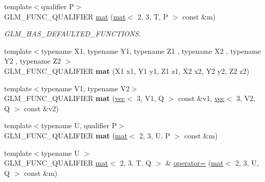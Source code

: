 \begin{DoxyCompactItemize}
{\footnotesize template$<$qualifier P$>$ }\\G\+L\+M\+\_\+\+F\+U\+N\+C\+\_\+\+Q\+U\+A\+L\+I\+F\+I\+ER \hyperlink{structglm_1_1mat_3_012_00_013_00_01T_00_01Q_01_4_aca73168bd1cc20d17c4621f87e35978f}{mat} (\hyperlink{structglm_1_1mat}{mat}$<$ 2, 3, T, P $>$ const \&m)
\begin{DoxyCompactList}\small\item\em G\+L\+M\+\_\+\+H\+A\+S\+\_\+\+D\+E\+F\+A\+U\+L\+T\+E\+D\+\_\+\+F\+U\+N\+C\+T\+I\+O\+NS. \end{DoxyCompactList}\item 
\mbox{\label{structglm_1_1mat_3_012_00_013_00_01T_00_01Q_01_4_a00e5c686d76972023046a5164c62c48b}} 
{\footnotesize template$<$typename X1, typename Y1, typename Z1 , typename X2 , typename Y2 , typename Z2 $>$ }\\G\+L\+M\+\_\+\+F\+U\+N\+C\+\_\+\+Q\+U\+A\+L\+I\+F\+I\+ER {\bfseries mat} (X1 x1, Y1 y1, Z1 z1, X2 x2, Y2 y2, Z2 z2)
\item 
\mbox{\label{structglm_1_1mat_3_012_00_013_00_01T_00_01Q_01_4_ae1102819aa6417b67a509f73cafa1f60}} 
{\footnotesize template$<$typename V1, typename V2$>$ }\\G\+L\+M\+\_\+\+F\+U\+N\+C\+\_\+\+Q\+U\+A\+L\+I\+F\+I\+ER {\bfseries mat} (\hyperlink{structglm_1_1vec}{vec}$<$ 3, V1, Q $>$ const \&v1, \hyperlink{structglm_1_1vec}{vec}$<$ 3, V2, Q $>$ const \&v2)
\item 
\mbox{\label{structglm_1_1mat_3_012_00_013_00_01T_00_01Q_01_4_a6f9b530f3d31def09cc5341a0e7c30a4}} 
{\footnotesize template$<$typename U, qualifier P$>$ }\\G\+L\+M\+\_\+\+F\+U\+N\+C\+\_\+\+Q\+U\+A\+L\+I\+F\+I\+ER {\bfseries mat} (\hyperlink{structglm_1_1mat}{mat}$<$ 2, 3, U, P $>$ const \&m)
\item 
\mbox{\label{structglm_1_1mat_3_012_00_013_00_01T_00_01Q_01_4_a14bf43496997f07336d6ef72b95065dc}} 
{\footnotesize template$<$typename U $>$ }\\G\+L\+M\+\_\+\+F\+U\+N\+C\+\_\+\+Q\+U\+A\+L\+I\+F\+I\+ER \hyperlink{structglm_1_1mat}{mat}$<$ 2, 3, T, Q $>$ \& \hyperlink{structglm_1_1mat_3_012_00_013_00_01T_00_01Q_01_4_a14bf43496997f07336d6ef72b95065dc}{operator=} (\hyperlink{structglm_1_1mat}{mat}$<$ 2, 3, U, Q $>$ const \&m)

\end{DoxyCompactItemize}
